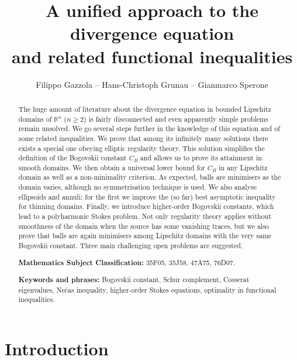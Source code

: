 \documentclass[11pt]{article}
\theoremstyle{plain}
\theoremstyle{definition}
\numberwithin{equation}{section}
\newcommand{\R}{\mathbb{R}}
\begin{document}
\title{A unified approach to the divergence equation\\
and related functional inequalities}

\author{Filippo Gazzola -- Hans-Christoph Grunau -- Gianmarco Sperone}

\date{}

\maketitle

\begin{abstract}
The huge amount of literature about the divergence equation in bounded Lipschitz domains of $\R^n$ ($n\ge2$) is fairly disconnected and even apparently
simple problems remain unsolved. We go several steps further in the knowledge of this equation and of some related inequalities.
We prove that among its infinitely many solutions there exists a special one obeying  elliptic regularity theory. This solution simplifies
the definition of the Bogovskii constant $C_B$ and allows us to prove its attainment in smooth domains. We then obtain a universal lower bound for
$C_B$ in any Lipschitz domain as well as a non-minimality criterion. As expected, balls are minimisers as the domain varies, although
no symmetrisation technique is used. We also analyse ellipsoids and annuli: for the first we improve the (so far) best
asymptotic inequality for thinning domains. Finally, we introduce higher-order Bogovskii constants, which lead to a polyharmonic Stokes problem. Not only regularity
theory applies without smoothness of the domain
when the source has some vanishing traces, but we also prove that balls are again minimisers among Lipschitz domains with the very same Bogovskii
constant. Three main challenging open problems are suggested.\par\noindent
{\bf Mathematics Subject Classification:} 35F05, 35J58, 47A75, 76D07.\par\noindent
{\bf Keywords and phrases:} Bogovskii constant, Schur complement, Cosserat eigenvalues, Ne\v{c}as inequality, higher-order Stokes equations,
optimality in functional inequalities.
\end{abstract}

{
	\hypersetup{linkcolor=black}
	\tableofcontents
}

\eject

\section{Introduction} \label{intro}
\end{document}
